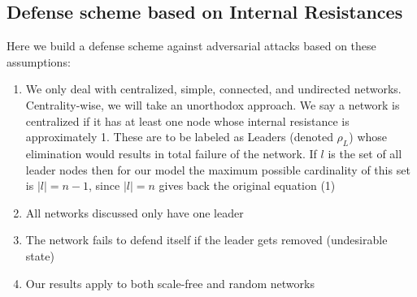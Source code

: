 \documentclass{article}
\begin{document}
	\subsection{Defense scheme based on Internal Resistances}
	Here we build a defense scheme against adversarial attacks based on these assumptions:
	
	\begin{enumerate}
		\item {We only deal with centralized, simple, connected, and undirected networks.}
		Centrality-wise, we will take an unorthodox approach. We say a network is centralized if it has at least one node whose internal resistance is approximately 1. These are to be labeled as Leaders (denoted $\rho_L$) whose elimination would results in total failure of the network. If $l$ is the set of all leader nodes then for our model the maximum possible cardinality of this set is $|l| = n-1$, since $|l|=n$ gives back the original equation (1)
		\item All networks discussed only have one leader
		\item {The network fails to defend itself if the leader gets removed (undesirable state)}
		\item {Our results apply to both scale-free and random networks}
	\end{enumerate}
	
\end{document}
